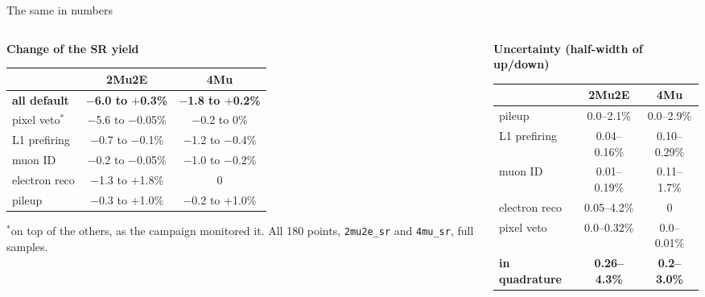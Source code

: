 \documentclass[aspectratio=169,11pt]{beamer}
\begin{document}
\begin{frame}{The same in numbers}
  \begin{columns}[T]
    \begin{column}{0.49\textwidth}
      \textbf{Change of the SR yield}\\[0.3em]
      {\footnotesize
      \begin{tabular}{@{}lcc@{}}
        \toprule
        & 2Mu2E & 4Mu \\
        \midrule
        \textbf{all default} & \textbf{$-$6.0 to $+$0.3\%} & \textbf{$-$1.8 to $+$0.2\%} \\
        pixel veto$^*$ & $-$5.6 to $-$0.05\% & $-$0.2 to 0\% \\
        L1 prefiring & $-$0.7 to $-$0.1\% & $-$1.2 to $-$0.4\% \\
        muon ID & $-$0.2 to $-$0.05\% & $-$1.0 to $-$0.2\% \\
        electron reco & $-$1.3 to $+$1.8\% & 0 \\
        pileup & $-$0.3 to $+$1.0\% & $-$0.2 to $+$1.0\% \\
        \bottomrule
      \end{tabular}}

      {\scriptsize $^*$on top of the others, as the campaign monitored it. All 180 points,
      \texttt{2mu2e\_sr} and \texttt{4mu\_sr}, full samples.}
    \end{column}
    \begin{column}{0.49\textwidth}
      \textbf{Uncertainty (half-width of up/down)}\\[0.3em]
      {\footnotesize
      \begin{tabular}{@{}lcc@{}}
        \toprule
        & 2Mu2E & 4Mu \\
        \midrule
        pileup & 0.0--2.1\% & 0.0--2.9\% \\
        L1 prefiring & 0.04--0.16\% & 0.10--0.29\% \\
        muon ID & 0.01--0.19\% & 0.11--1.7\% \\
        electron reco & 0.05--4.2\% & 0 \\
        pixel veto & 0.0--0.32\% & 0.0--0.01\% \\
        \textbf{in quadrature} & \textbf{0.26--4.3\%} & \textbf{0.2--3.0\%} \\
        \bottomrule
      \end{tabular}}
    \end{column}
  \end{columns}


\end{frame}
\end{document}
